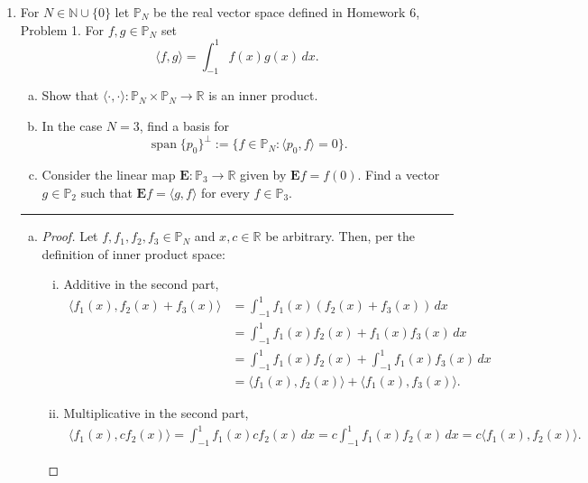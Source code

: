 \documentclass[12pt]{amsart}
\newcommand{\1}{\mathbbm{1}}
\numberwithin{equation}{section}
\numberwithin{Theorem}{section}
\theoremstyle{plain} %
\theoremstyle{definition}
\theoremstyle{remark}
\begin{document}
\thispagestyle{empty}

\bigskip


\begin{enumerate}[1.]

\item For \(N\in\mathbb{N}\cup\{0\}\) let \(\mathbb{P}_{N}\) be the real vector space defined in Homework 6, Problem 1. For \(f,g\in\mathbb{P}_{N}\) set
\[\langle f,g\rangle = \int_{-1}^{1}f(x)g(x)\,dx.\]

\begin{enumerate}[(a)]
\item Show that \(\langle\cdot,\cdot\rangle:\mathbb{P}_{N}\times\mathbb{P}_{N}\to\mathbb{R}\) is an inner product.\medskip

\item In the case \(N=3\), find a basis for 
\[\operatorname{span}\{p_{0}\}^{\bot}:=\{f\in\mathbb{P}_{N} : \langle p_{0},f\rangle = 0\}.\]

\item Consider the linear map \(\mathbf{E}:\mathbb{P}_{3}\to\mathbb{R}\) given by \(\mathbf{E}f = f(0)\). Find a vector \(g\in\mathbb{P}_{2}\) such that \(\mathbf{E}f = \langle g,f\rangle\) for every \(f\in\mathbb{P}_{3}\).

\end{enumerate}\bigskip

\hrule
\bigskip
\begin{enumerate}[(a)]
	\item
	\begin{proof}
	Let \(f,f_1,f_2,f_3\in\mathbb{P}_N\) and \(x,c\in\mathbb{R}\) be arbitrary.
	Then, per the definition of inner product space:
	\begin{enumerate}[i.]
		\item Additive in the second part,
		\begin{align*}
			\langle f_1(x), f_2(x)+f_3(x) \rangle
			&= \int_{-1}^{1}f_1(x) (f_2(x)+f_3(x))\,dx \\
			&= \int_{-1}^{1}f_1(x)f_2(x)+ f_1(x)f_3(x)\,dx \\
			&= \int_{-1}^{1}f_1(x)f_2(x)+ \int_{-1}^{1}f_1(x)f_3(x)\,dx \\
			&= \langle f_1(x),f_2(x)\rangle + \langle f_1(x),f_3(x)\rangle .
		\end{align*}
		
		\item Multiplicative in the second part,
		\begin{align*}
			\langle f_1(x),cf_2(x)\rangle
			= \int_{-1}^{1}f_1(x) cf_2(x)\,dx 
			= c\int_{-1}^{1}f_1(x)f_2(x)\,dx 
			= c\langle f_1(x),f_2(x)\rangle .
		\end{align*}
		

\end{enumerate}
\end{proof}
\end{enumerate}
\end{enumerate}
\end{document}
